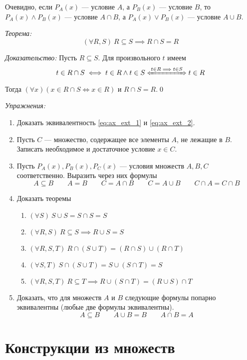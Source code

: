 Очевидно, если $P_{A}(x)$ --- условие $A$, а $P_{B}(x)$ --- условие $B$,
то $P_{A}(x)\land P_{B}(x)$ --- условие $A\cap B$,
а $P_{A}(x)\lor P_{B}(x)$ --- условие $A\cup B$.

\vspace{1em}
{\it Теорема:}
\[
  (\forall R,S)~R\subseteq S\implies R\cap S=R
\]

{\it Доказательство:}
Пусть $R\subseteq S$. Для произвольного $t$ имеем
\[
  t\in R\cap S\iff t\in R\land t\in S\xLeftrightarrow{t\in R\implies t\in S} t\in R
\]
Тогда $(\forall x)(x\in R\cap S\iff x\in R)$ и $R\cap S=R$.\qed

\newcommand\eset{\varnothing}
\vspace{1em}
{\it Упражнения:}
\begin{enumerate}
  \item{}Доказать эквивалентность \eqref{eq:ax_ext_1} и \eqref{eq:ax_ext_2}.

  \item{}Пусть $C$ --- множество, содержащее все элементы $A$, не лежащие в $B$.
  Записать необходимое и достаточное условие $x\in C$.

  \item{}Пусть $P_{A}(x), P_{B}(x),P_{C}(x)$ --- условия множеств
  $A,B,C$ соответственно. Выразить через них формулы
  \[
    A\subseteq B\qquad A=B\qquad
    C=A\cap B\qquad C=A\cup B\qquad
    C\cap A=C\cap B
  \]

  \item{}Доказать теоремы
  \begin{enumerate}
    \item{}$(\forall S)~S\cup S=S\cap S=S$
    \item{}$(\forall R,S)~R\subseteq S\implies R\cup S=S$
    \item{}$(\forall R,S,T)~R\cap (S\cup T)=(R\cap S)\cup (R\cap T)$
    \item{}$(\forall S, T)~S\cap (S\cup T)=S\cup (S\cap T)=S$
    \item{}$(\forall R,S, T)~R\subseteq T\implies R\cup (S\cap T)=(R\cup S)\cap T$
  \end{enumerate}


  \item{}Доказать, что для множеств $A$ и $B$ следующие формулы попарно эквивалентны
  (любые две формулы эквивалентны).
  \[
    A\subseteq B\qquad A\cup B=B\qquad A\cap B=A
  \]
\end{enumerate}

\section{Конструкции из множеств}

